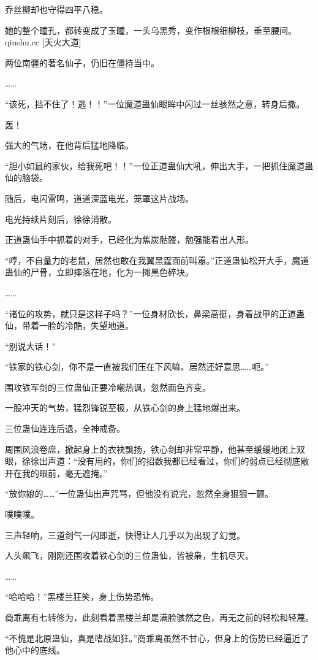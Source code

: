 \begin{this_body}
乔丝柳却也守得四平八稳。

她的整个瞳孔，都转变成了玉瞳，一头乌黑秀，变作根根细柳枝，垂至腰间。qiushu.cc [天火大道]

两位南疆的著名仙子，仍旧在僵持当中。

……

“该死，挡不住了！逃！！”一位魔道蛊仙眼眸中闪过一丝骇然之意，转身后撤。

轰！

强大的气场，在他背后猛地降临。

“胆小如鼠的家伙，给我死吧！！”一位正道蛊仙大吼，伸出大手，一把抓住魔道蛊仙的脑袋。

随后，电闪雷鸣，道道深蓝电光，笼罩这片战场。

电光持续片刻后，徐徐消散。

正道蛊仙手中抓着的对手，已经化为焦炭骷髅，勉强能看出人形。

“哼，不自量力的老鼠，居然也敢在我翼黑霆面前叫嚣。”正道蛊仙松开大手，魔道蛊仙的尸骨，立即摔落在地，化为一摊黑色碎块。

……

“诸位的攻势，就只是这样子吗？”一位身材欣长，鼻梁高挺，身着战甲的正道蛊仙，带着一脸的冷酷，失望地道。

“别说大话！”

“铁家的铁心剑，你不是一直被我们压在下风嘛。居然还好意思……呃。”

围攻铁军剑的三位蛊仙正要冷嘲热讽，忽然面色齐变。

一股冲天的气势，猛烈锋锐至极，从铁心剑的身上猛地爆出来。

三位蛊仙连连后退，全神戒备。

周围风浪卷席，掀起身上的衣袂飘扬，铁心剑却非常平静，他甚至缓缓地闭上双眼，徐徐出声道：“没有用的，你们的招数我都已经看过，你们的弱点已经彻底敞开在我的眼前，毫无遮掩。”

“放你娘的……”一位蛊仙出声咒骂，但他没有说完，忽然全身狠狠一颤。

噗噗噗。

三声轻响，三道剑气一闪即逝，快得让人几乎以为出现了幻觉。

人头飙飞，刚刚还围攻着铁心剑的三位蛊仙，皆被枭，生机尽灭。

……

“哈哈哈！”黑楼兰狂笑，身上伤势恐怖。

商乖离有七转修为，此刻看着黑楼兰却是满脸骇然之色，再无之前的轻松和轻蔑。

“不愧是北原蛊仙，真是嗜战如狂。”商乖离虽然不甘心，但身上的伤势已经逼近了他心中的底线。


\end{this_body}
